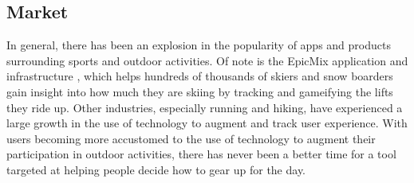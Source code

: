 \subsection{Market}
In general, there has been an explosion in the popularity of apps and products surrounding sports and outdoor activities.
Of note is the EpicMix application and infrastructure \cite{EpicMix:Site}, which helps hundreds of thousands of skiers and snow
boarders \cite{EpicMix:PlayStore} gain insight into how much they are skiing by tracking and gameifying the lifts they ride up.
Other industries, especially running and hiking, have experienced a large growth in the use of technology to augment and 
track user experience. With users becoming more accustomed to the use of technology to augment their participation in outdoor
activities, there has never been a better time for a tool targeted at helping people decide how to gear up for the day.
